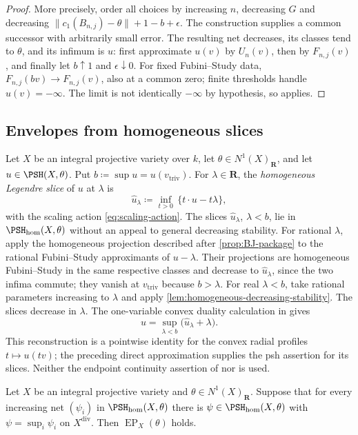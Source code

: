\documentclass[11pt,a4paper]{article}
\newcommand{\divv}{\mathrm{div}}       %
\newcommand{\vtriv}{v_{\mathrm{triv}}} %
\newcommand{\PSHhom}{\PSH_{\mathrm{hom}}}          %
\newcommand{\EP}{\operatorname{EP}}
\begin{document}
\begin{proof}
More precisely, order all choices by increasing $n$, decreasing $G$ and decreasing $\|c_1(B_{n,j})-\theta\|+1-b+\epsilon$. The construction supplies a common successor with arbitrarily small error. The resulting net decreases, its classes tend to $\theta$, and its infimum is $u$: first approximate $u(v)$ by $U_n(v)$, then by $F_{n,j}(v)$, and finally let $b\uparrow1$ and $\epsilon\downarrow0$. For fixed Fubini--Study data, $F_{n,j}(bv)\to F_{n,j}(v)$, also at a common zero; finite thresholds handle $u(v)=-\infty$. The limit is not identically $-\infty$ by hypothesis, so \cite[Definition~4.1]{BJ22} applies.
\end{proof}

\subsection{Envelopes from homogeneous slices}

Let $X$ be an integral projective variety over $k$, let $\theta\in N^1(X)_{\mathbf R}$, and let $u\in\PSH(X,\theta)$. Put $b\coloneqq\sup u=u(\vtriv)$. For $\lambda\in\mathbf R$, the \emph{homogeneous Legendre slice} of $u$ at $\lambda$ is
\[
  \widehat u_\lambda\coloneqq\inf_{t>0}\,\{t\mathbin\cdot u-t\lambda\},
\]
with the scaling action \eqref{eq:scaling-action}. The slices $\widehat u_\lambda$, $\lambda<b$, lie in $\PSHhom(X,\theta)$ without an appeal to general decreasing stability. For rational $\lambda$, apply the homogeneous projection described after \cref{prop:BJ-package} to the rational Fubini--Study approximants of $u-\lambda$. Their projections are homogeneous Fubini--Study in the same respective classes and decrease to $\widehat u_\lambda$, since the two infima commute; they vanish at $\vtriv$ because $b>\lambda$. For real $\lambda<b$, take rational parameters increasing to $\lambda$ and apply \cref{lem:homogeneous-decreasing-stability}. The slices decrease in $\lambda$. The one-variable convex duality calculation in \cite[Theorem~6.24]{BJ22} gives
\begin{equation}\label{eq:Legendre-reconstruction}
  u=\sup_{\lambda<b}\bigl(\widehat u_\lambda+\lambda\bigr).
\end{equation}
This reconstruction is a pointwise identity for the convex radial profiles $t\mapsto u(tv)$; the preceding direct approximation supplies the psh assertion for its slices. Neither the endpoint continuity assertion of \cite[Lemma~6.23]{BJ22} nor \cite[Theorem~6.21]{BJ22} is used.

\begin{proposition}\label{prop:homogeneous-slices}
Let $X$ be an integral projective variety and $\theta\in N^1(X)_{\mathbf R}$. Suppose that for every increasing net $(\psi_i)$ in $\PSHhom(X,\theta)$ there is $\psi\in\PSHhom(X,\theta)$ with $\psi=\sup_i\psi_i$ on $X^{\divv}$. Then $\EP_X(\theta)$ holds.
\end{proposition}
\end{document}
